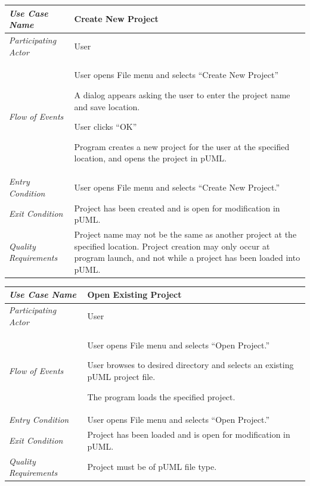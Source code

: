 \documentclass[twoside,letterpaper]{article}
\newenvironment{my_enumerate}{
\begin{enumerate}
  \setlength{\itemsep}{1pt}
  \setlength{\parskip}{0pt}
  \setlength{\parsep}{0pt}}{\end{enumerate}
}
\begin{document}
\begin{flushleft}
\tablehead{}
\begin{tabular}{|m{2.0in} m{5.0in}|}
\hline
{\bfseries\emph{Use Case Name}}
& {\bfseries Create New Project}
\\\hline
\emph{Participating Actor}
& User
\\\hline
\emph{Flow of Events}
& \begin{my_enumerate}
  \item User opens File menu and selects ``Create New Project'' 
  \item A dialog appears asking the user to enter the project name and save location. 
    \item User clicks ``OK'' 
\item Program creates a new project for the user at the specified location, and opens the project in pUML.
\end{my_enumerate}
\\\hline
\emph{Entry Condition}
&
User opens File menu and selects ``Create New Project.''
\\\hline
\emph{Exit Condition}
& Project has been created and is open for modification in pUML.
\\\hline
\emph{Quality Requirements}
& Project name may not be the same as another project at the specified location. Project creation may only occur at program launch, and not while a project has been loaded into pUML.
\\\hline
\end{tabular}
\end{flushleft}
\bigskip

\begin{flushleft}
\tablehead{}
\begin{tabular}{|m{2.0in} m{5.0in}|}
\hline
{\bfseries\emph{Use Case Name}}
& {\bfseries Open Existing Project}
\\\hline
\emph{Participating Actor}
& User
\\\hline
\emph{Flow of Events}
& \begin{my_enumerate}
\item User opens File menu and selects ``Open Project.''
\item User browses to desired directory and selects an existing pUML project file.
\item The program loads the specified project.
\end{my_enumerate}
\\\hline
\emph{Entry Condition}
& User opens File menu and selects ``Open Project.''
\\\hline
\emph{Exit Condition}
& Project has been loaded and is open for modification in pUML.
\\\hline
\emph{Quality Requirements}
& Project must be of pUML file type.
\\\hline
\end{tabular}
\end{flushleft}
\bigskip
\end{document}
